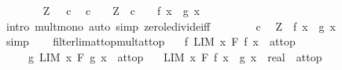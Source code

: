 \begin{isabellebody}
\ \ \ \ \isamarkupfalse%
\ {\isacartoucheopen}{}\ {\isacharless}{\kern0pt}\ Z{\isacartoucheclose}\ {\isacartoucheopen}{}\ {\isacharless}{\kern0pt}\ c{\isacartoucheclose}\ \isamarkupfalse%
\ {\isachardoublequoteopen}c\ {\isacharslash}{\kern0pt}\ {}\ {\isacharasterisk}{\kern0pt}\ {\isacharparenleft}{\kern0pt}Z\ {\isacharslash}{\kern0pt}\ c\ {\isacharasterisk}{\kern0pt}\ {}{\isacharparenright}{\kern0pt}\ {\isasymle}\ f\ x\ {\isacharasterisk}{\kern0pt}\ g\ x{\isachardoublequoteclose}\isanewline
\ \ \ \ \ \ \isamarkupfalse%
\ {\isacharparenleft}{\kern0pt}intro\ mult{\isacharunderscore}{\kern0pt}mono{\isacharparenright}{\kern0pt}\ {\isacharparenleft}{\kern0pt}auto\ simp{\isacharcolon}{\kern0pt}\ zero{\isacharunderscore}{\kern0pt}le{\isacharunderscore}{\kern0pt}divide{\isacharunderscore}{\kern0pt}iff{\isacharparenright}{\kern0pt}\isanewline
\ \ \ \ \isamarkupfalse%
\ {\isacartoucheopen}{}\ {\isacharless}{\kern0pt}\ c{\isacartoucheclose}\ \isamarkupfalse%
\ {\isachardoublequoteopen}Z\ {\isasymle}\ f\ x\ {\isacharasterisk}{\kern0pt}\ g\ x{\isachardoublequoteclose}\isanewline
\ \ \ \ \ \ \ \isamarkupfalse%
\ simp\isanewline
\ \ \isamarkupfalse%
\isanewline
{}\isamarkupfalse%
%
\endisatagproof
{\isafoldproof}%
%
\isadelimproof
\isanewline
%
\endisadelimproof
\isanewline
{}\isamarkupfalse%
\ filterlim{\isacharunderscore}{\kern0pt}at{\isacharunderscore}{\kern0pt}top{\isacharunderscore}{\kern0pt}mult{\isacharunderscore}{\kern0pt}at{\isacharunderscore}{\kern0pt}top{\isacharcolon}{\kern0pt}\isanewline
\ \ \ f{\isacharcolon}{\kern0pt}\ {\isachardoublequoteopen}LIM\ x\ F{\isachardot}{\kern0pt}\ f\ x\ {\isacharcolon}{\kern0pt}{\isachargreater}{\kern0pt}\ at{\isacharunderscore}{\kern0pt}top{\isachardoublequoteclose}\isanewline
\ \ \ \ \ g{\isacharcolon}{\kern0pt}\ {\isachardoublequoteopen}LIM\ x\ F{\isachardot}{\kern0pt}\ g\ x\ {\isacharcolon}{\kern0pt}{\isachargreater}{\kern0pt}\ at{\isacharunderscore}{\kern0pt}top{\isachardoublequoteclose}\isanewline
\ \ \ {\isachardoublequoteopen}LIM\ x\ F{\isachardot}{\kern0pt}\ {\isacharparenleft}{\kern0pt}f\ x\ {\isacharasterisk}{\kern0pt}\ g\ x\ {\isacharcolon}{\kern0pt}{\isacharcolon}{\kern0pt}\ real{\isacharparenright}{\kern0pt}\ {\isacharcolon}{\kern0pt}{\isachargreater}{\kern0pt}\ at{\isacharunderscore}{\kern0pt}top{\isachardoublequoteclose}\isanewline
%
\isadelimproof
\ \ %
\endisadelimproof

\end{isabellebody}
